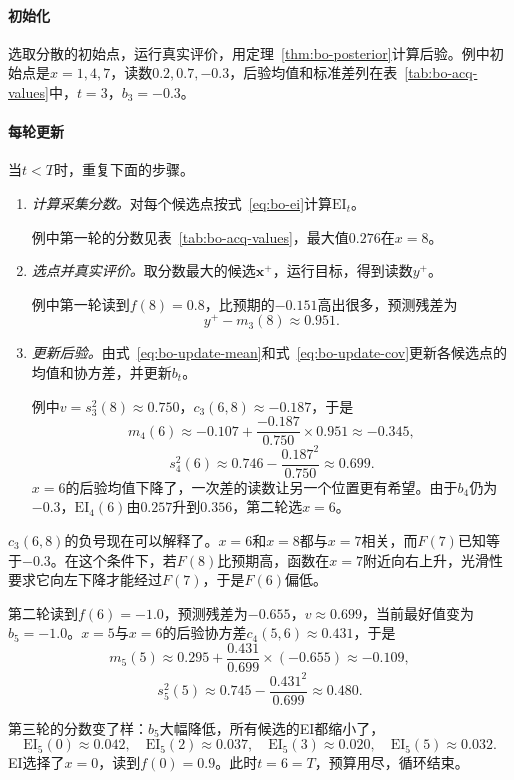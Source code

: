 \paragraph{初始化}
选取分散的初始点，运行真实评价，用定理~\ref{thm:bo-posterior}计算后验。例中初始点是$x=1,4,7$，读数$0.2,0.7,-0.3$，后验均值和标准差列在表~\ref{tab:bo-acq-values}中，$t=3$，$b_3=-0.3$。

\paragraph{每轮更新}
当$t<T$时，重复下面的步骤。
\begin{enumerate}
 \item \emph{计算采集分数。}对每个候选点按式~\eqref{eq:bo-ei}计算$\mathrm{EI}_t$。

 例中第一轮的分数见表~\ref{tab:bo-acq-values}，最大值$0.276$在$x=8$。

 \item \emph{选点并真实评价。}取分数最大的候选$\bm{x}^+$，运行目标，得到读数$y^+$。

 例中第一轮读到$f(8)=0.8$，比预期的$-0.151$高出很多，预测残差为
 \[
  y^+-m_3(8)\approx0.951.
 \]

 \item \emph{更新后验。}由式~\eqref{eq:bo-update-mean}和式~\eqref{eq:bo-update-cov}更新各候选点的均值和协方差，并更新$b_t$。

 例中$v=s_3^2(8)\approx0.750$，$c_3(6,8)\approx-0.187$，于是
 \[
  m_4(6)\approx-0.107+\frac{-0.187}{0.750}\times0.951\approx-0.345,
 \]
 \[
  s_4^2(6)\approx0.746-\frac{0.187^2}{0.750}\approx0.699.
 \]
 $x=6$的后验均值下降了，一次差的读数让另一个位置更有希望。由于$b_4$仍为$-0.3$，$\mathrm{EI}_4(6)$由$0.257$升到$0.356$，第二轮选$x=6$。
\end{enumerate}

$c_3(6,8)$的负号现在可以解释了。$x=6$和$x=8$都与$x=7$相关，而$F(7)$已知等于$-0.3$。在这个条件下，若$F(8)$比预期高，函数在$x=7$附近向右上升，光滑性要求它向左下降才能经过$F(7)$，于是$F(6)$偏低。

第二轮读到$f(6)=-1.0$，预测残差为$-0.655$，$v\approx0.699$，当前最好值变为$b_5=-1.0$。$x=5$与$x=6$的后验协方差$c_4(5,6)\approx0.431$，于是
\[
 m_5(5)\approx0.295+\frac{0.431}{0.699}\times(-0.655)\approx-0.109,
\]
\[
 s_5^2(5)\approx0.745-\frac{0.431^2}{0.699}\approx0.480.
\]

第三轮的分数变了样：$b_5$大幅降低，所有候选的EI都缩小了，
\[
 \mathrm{EI}_5(0)\approx0.042,\quad\mathrm{EI}_5(2)\approx0.037,\quad
 \mathrm{EI}_5(3)\approx0.020,\quad\mathrm{EI}_5(5)\approx0.032.
\]
EI选择了$x=0$，读到$f(0)=0.9$。此时$t=6=T$，预算用尽，循环结束。

